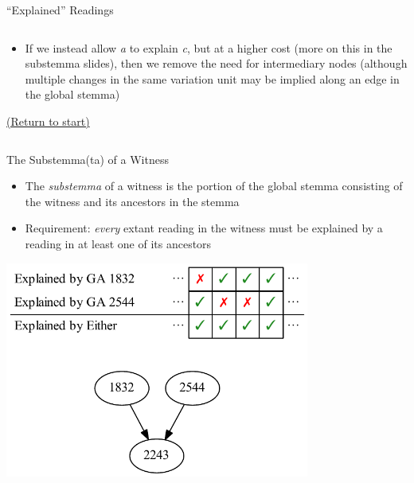 \documentclass[10pt]{beamer}
\begin{document}
\begin{frame}{``Explained'' Readings}
\begin{columns}
\begin{column}{0.55\textwidth}
				\begin{itemize}
					\item If we instead allow \emph{a} to explain \emph{c}, but at a higher cost (more on this in the substemma slides), then we remove the need for intermediary nodes (although multiple changes in the same variation unit may be implied along an edge in the global stemma)
				\end{itemize}
				\begin{center}
					\hyperlink{slide:crossroad}{(Return to start)}
				\end{center}
			\end{column}
		\end{columns}
	\end{frame}
	\begin{frame}{The Substemma(ta) of a Witness}\label{slide:substemma}
		\begin{itemize}
			\item The \emph{substemma} of a witness is the portion of the global stemma consisting of the witness and its ancestors in the stemma
			\item Requirement: \emph{every} extant reading in the witness must be explained by a reading in at least one of its ancestors
		\end{itemize}
		\begin{center}
			\includegraphics[width=0.75\textwidth]{../graphics/ga-2243-substemma.pdf}
		\end{center}
	\end{frame}
\end{document}
